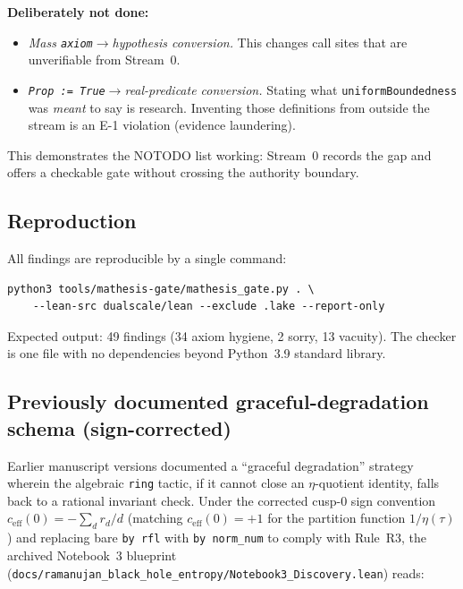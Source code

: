 \documentclass[11pt,a4paper]{article}
\theoremstyle{plain}
\theoremstyle{definition}
\theoremstyle{remark}
\begin{document}
\noindent
\textbf{Deliberately not done:}
\begin{itemize}
  \item \emph{Mass \texttt{axiom}$\to$hypothesis conversion.}
    This changes call sites that are unverifiable from Stream~0.
  \item \emph{\texttt{Prop := True}$\to$real-predicate conversion.}
    Stating what \texttt{uniformBoundedness} was \emph{meant} to say is
    research.
    Inventing those definitions from outside the stream is an E-1
    violation (evidence laundering).
\end{itemize}

\noindent
This demonstrates the NOTODO list working: Stream~0 records the gap
and offers a checkable gate without crossing the authority boundary.

\subsection*{Reproduction}

All findings are reproducible by a single command:
\begin{verbatim}
python3 tools/mathesis-gate/mathesis_gate.py . \
    --lean-src dualscale/lean --exclude .lake --report-only
\end{verbatim}
Expected output: 49 findings (34 axiom hygiene, 2 sorry, 13 vacuity).
The checker is one file with no dependencies beyond Python~3.9 standard
library.

\subsection*{Previously documented graceful-degradation schema (sign-corrected)}

Earlier manuscript versions documented a ``graceful degradation'' strategy
wherein the algebraic \texttt{ring} tactic, if it cannot close an
$\eta$-quotient identity, falls back to a rational invariant check.
Under the corrected cusp-$0$ sign convention
$c_{\text{eff}}(0) = -\sum_d r_d/d$ (matching $c_{\text{eff}}(0)=+1$ for
the partition function $1/\eta(\tau)$) and replacing bare \texttt{by rfl}
with \texttt{by norm\_num} to comply with Rule~R3, the archived Notebook~3
blueprint (\texttt{docs/ramanujan\_black\_hole\_entropy/Notebook3\_Discovery.lean})
reads:
\end{document}
